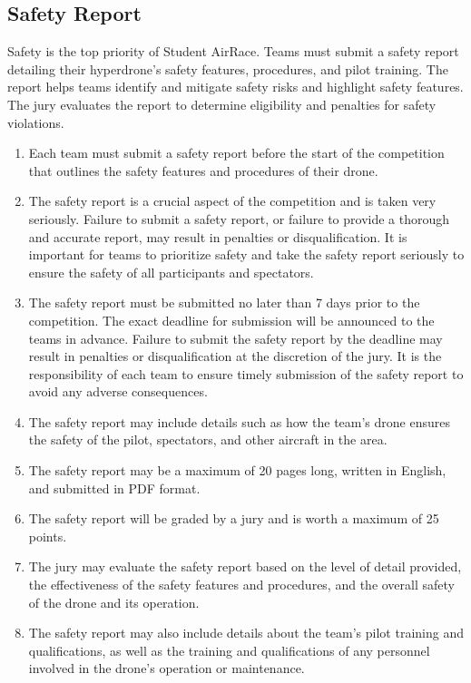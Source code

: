     \subsection{Safety Report}
    Safety is the top priority of Student AirRace. Teams must submit a safety report detailing their hyperdrone's safety features, procedures, and pilot training. The report helps teams identify and mitigate safety risks and highlight safety features. The jury evaluates the report to determine eligibility and penalties for safety violations.
    \begin{enumerate}
    \item Each team must submit a safety report before the start of the competition that outlines the safety features and procedures of their drone.
    \item The safety report is a crucial aspect of the competition and is taken very seriously. Failure to submit a safety report, or failure to provide a thorough and accurate report, may result in penalties or disqualification. It is important for teams to prioritize safety and take the safety report seriously to ensure the safety of all participants and spectators.
    \item The safety report must be submitted no later than 7 days prior to the competition. The exact deadline for submission will be announced to the teams in advance. Failure to submit the safety report by the deadline may result in penalties or disqualification at the discretion of the jury. It is the responsibility of each team to ensure timely submission of the safety report to avoid any adverse consequences.
    \item The safety report may include details such as how the team's drone ensures the safety of the pilot, spectators, and other aircraft in the area.
    \item The safety report may be a maximum of 20 pages long, written in English, and submitted in PDF format.
    \item The safety report will be graded by a jury and is worth a maximum of 25 points.
    \item The jury may evaluate the safety report based on the level of detail provided, the effectiveness of the safety features and procedures, and the overall safety of the drone and its operation.
    \item The safety report may also include details about the team's pilot training and qualifications, as well as the training and qualifications of any personnel involved in the drone's operation or maintenance.

\end{enumerate}

